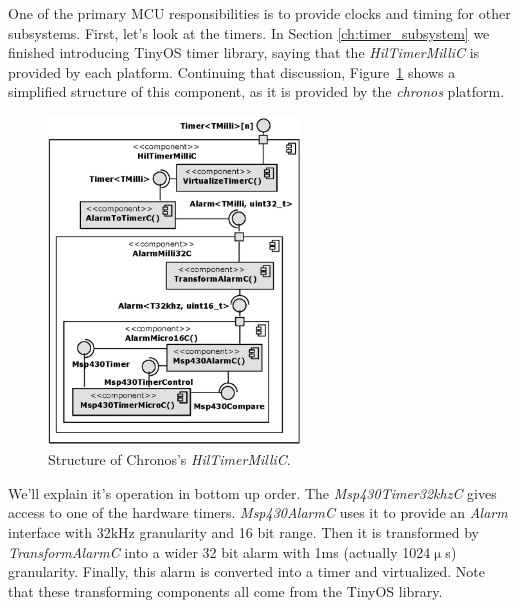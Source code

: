 One of the primary MCU responsibilities is to provide clocks and timing for other subsystems. First, let's look at the timers. In Section \ref{ch:timer_subsystem} we finished introducing TinyOS timer library, saying that the \emph{HilTimerMilliC} is provided by each platform. Continuing that discussion, Figure~\ref{fig:hil_timer_milli_c} shows a simplified structure of this component, as it is provided by the \emph{chronos} platform.
\begin{figure}[h]
  \centering
  \includegraphics[width=0.6\textwidth]{diagrams/hil_timer_milli_c.eps}
  \caption{Structure of Chronos's \emph{HilTimerMilliC}.}
  \label{fig:hil_timer_milli_c}
\end{figure}
We'll explain it's operation in bottom up order. The \emph{Msp430Timer32khzC} gives access to one of the hardware timers. \emph{Msp430AlarmC} uses it to provide an \emph{Alarm} interface with 32kHz granularity and 16 bit range. Then it is transformed by \emph{TransformAlarmC} into a wider 32 bit alarm with 1ms (actually 1024$\upmu$s) granularity. Finally, this alarm is converted into a timer and virtualized. Note that these transforming components all come from the TinyOS library.

